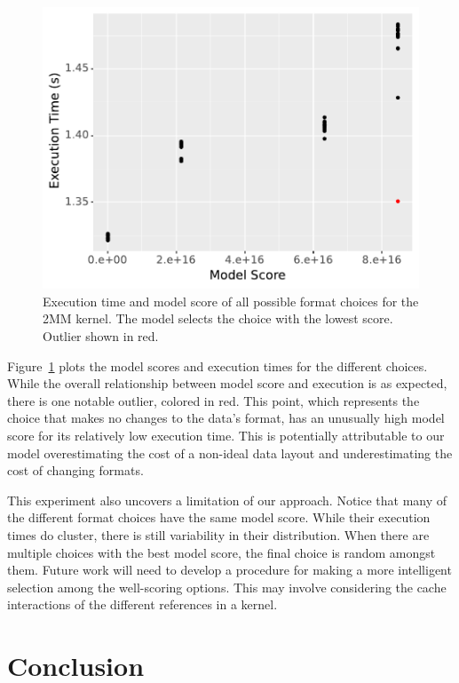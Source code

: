 \documentclass[sigconf]{acmart}
\begin{document}
\begin{figure}
	\includegraphics[width=\columnwidth]{2mm-all.pdf}
	\caption{Execution time and model score of all possible format choices for the 2MM kernel. The model selects the choice with the lowest score. Outlier shown in red.}
	\label{2MMAllChoices}
\end{figure}


Figure~\ref{2MMAllChoices} plots the model scores and execution times for the different choices. 
While the overall relationship between model score and execution is as expected, there is one notable outlier, colored in red.
This point, which represents the choice that makes no changes to the data's format, has an unusually high model score for its relatively low execution time. 
This is potentially attributable to our model overestimating the cost of a non-ideal data layout and underestimating the cost of changing formats. 

This experiment also uncovers a limitation of our approach.
Notice that many of the different format choices have the same model score.
While their execution times do cluster, there is still variability in their distribution.
When there are multiple choices with   the best model score, the final choice is random amongst them.
Future work will need to develop a procedure for making a more intelligent selection among the well-scoring options. 
This may involve considering the cache interactions of the different references in a kernel. 


\section{Conclusion}
\end{document}
